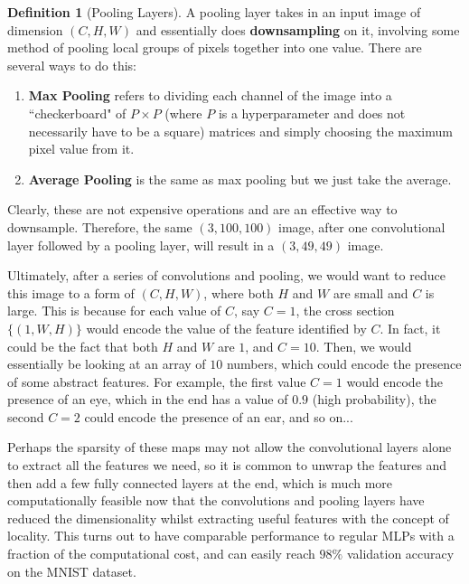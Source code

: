 \documentclass{article}
\theoremstyle{definition}
\theoremstyle{remark}
\theoremstyle{definition}
\newtheorem{definition}{Definition}[section]
\begin{document}
    \begin{definition}[Pooling Layers]
      A pooling layer takes in an input image of dimension $(C, H, W)$ and essentially does \textbf{downsampling} on it, involving some method of pooling local groups of pixels together into one value. There are several ways to do this: 
      \begin{enumerate}
        \item \textbf{Max Pooling} refers to dividing each channel of the image into a ``checkerboard" of $P \times P$ (where $P$ is a hyperparameter and does not necessarily have to be a square) matrices and simply choosing the maximum pixel value from it. 
        \item \textbf{Average Pooling} is the same as max pooling but we just take the average. 
      \end{enumerate}
      Clearly, these are not expensive operations and are an effective way to downsample. Therefore, the same $(3, 100, 100)$ image, after one convolutional layer followed by a pooling layer, will result in a $(3, 49, 49)$ image.  
    \end{definition}

    Ultimately, after a series of convolutions and pooling, we would want to reduce this image to a form of $(C, H, W)$, where both $H$ and $W$ are small and $C$ is large. This is because for each value of $C$, say $C = 1$, the cross section $\{(1, W, H)\}$ would encode the value of the feature identified by $C$. In fact, it could be the fact that both $H$ and $W$ are $1$, and $C = 10$. Then, we would essentially be looking at an array of $10$ numbers, which could encode the presence of some abstract features. For example, the first value $C = 1$ would encode the presence of an eye, which in the end has a value of $0.9$ (high probability), the second $C = 2$ could encode the presence of an ear, and so on... 

    Perhaps the sparsity of these maps may not allow the convolutional layers alone to extract all the features we need, so it is common to unwrap the features and then add a few fully connected layers at the end, which is much more computationally feasible now that the convolutions and pooling layers have reduced the dimensionality whilst extracting useful features with the concept of locality. This turns out to have comparable performance to regular MLPs with a fraction of the computational cost, and can easily reach $98\%$ validation accuracy on the MNIST dataset. 
\end{document}
